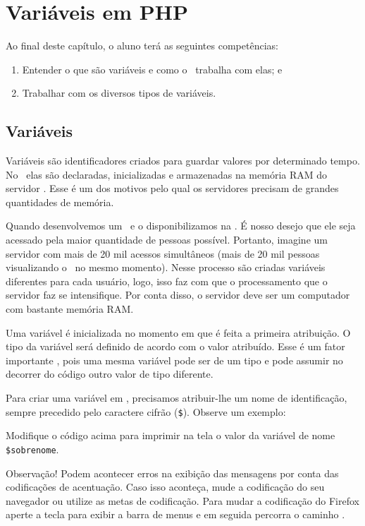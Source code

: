 \chapter{Variáveis em PHP}

Ao final deste capítulo, o aluno terá as seguintes competências:
\begin{enumerate}
    \item Entender o que são variáveis e como o \php~trabalha com elas; e
    \item Trabalhar com os diversos tipos de variáveis.
\end{enumerate}

\section{Variáveis}
\label{variaveis}

Variáveis são identificadores criados para guardar valores por determinado tempo. 
No \php~elas são declaradas, inicializadas e armazenadas na memória RAM do servidor \web. 
Esse é um dos motivos pelo qual os servidores precisam de grandes quantidades de memória.

Quando desenvolvemos um \site~e o disponibilizamos na \internet. É nosso desejo que ele seja
acessado pela maior quantidade de pessoas possível. Portanto, imagine um servidor com mais 
de 20 mil acessos simultâneos (mais de 20 mil pessoas visualizando o \site~no mesmo momento).
Nesse processo são criadas variáveis diferentes para cada usuário, logo, isso faz com que o 
processamento que o servidor faz se intensifique. Por conta disso, o servidor deve ser um 
computador com bastante memória RAM.

Uma variável é inicializada no momento em que é feita a primeira atribuição. O tipo da
variável será definido de acordo com o valor atribuído. Esse é um fator importante \php, 
pois uma mesma variável pode ser de um tipo e pode assumir no decorrer do código outro 
valor de tipo diferente.

Para criar uma variável em \php, precisamos atribuir-lhe um nome de identificação, 
sempre precedido pelo caractere cifrão (\texttt{\$}). Observe um exemplo:



Modifique o código acima para imprimir na tela o valor da variável de 
nome \texttt{\$sobrenome}.

Observação! Podem acontecer erros na exibição das mensagens por conta 
das codificações de acentuação. Caso isso aconteça, mude a codificação 
do seu navegador ou utilize as metas de codificação. Para mudar a codificação
do Firefox aperte a tecla \keys{\Alt} para exibir a barra de menus e em seguida
percorra o caminho .

